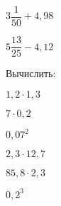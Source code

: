 \begin{class}[type=class, number=1]
\begin{listofex}
\begin{enumcols}[itemcolumns=6]
			\item \( 3\dfrac{1}{50}+4,98 \)
			\item \( 5\dfrac{13}{25}-4,12 \)
		\end{enumcols}
		\item Вычислить:
		\begin{enumcols}[itemcolumns=6]
			\item \( 1,2\cdot1,3 \)
			\item \( 7\cdot0,2 \)
			\item \( 0,07^2 \)
			\item \( 2,3\cdot12,7 \)
			\item \( 85,8\cdot2,3 \)
			\item \( 0,2^3 \)
		\end{enumcols}
	\end{listofex}
\end{class}
%
